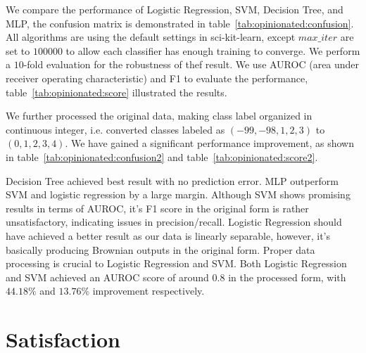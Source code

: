 \documentclass[11pt,twocolumn,letterpaper]{article}
\begin{document}
\begin{table}[htb]
\vspace{-1mm}
    \caption{Performance of different models in classifying $Opinionated$, after data processing. Values are averaged over $10$-fold evaluations.}
\label{tab:opinionated:score2}\vspace{-3mm}
\end{table}

We compare the performance of Logistic Regression, SVM, Decision Tree, and MLP, the confusion matrix is demonstrated in table~\ref{tab:opinionated:confusion}.
All algorithms are using the default settings in sci-kit-learn, except $max\_iter$ are set to $100000$ to allow each classifier has enough training to converge.
We perform a $10$-fold evaluation for the robustness of thef result.
We use AUROC (area under receiver operating characteristic) and F1 to evaluate the performance, table~\ref{tab:opinionated:score} illustrated the results.

We further processed the original data, making class label organized in continuous integer, i.e. converted classes labeled as $(-99, -98, 1, 2, 3)$ to $(0, 1, 2, 3, 4)$.
We have gained a significant performance improvement, as shown in table~\ref{tab:opinionated:confusion2} and table~\ref{tab:opinionated:score2}.

Decision Tree achieved best result with no prediction error.
MLP outperform SVM and logistic regression by a large margin.
Although SVM shows promising results in terms of AUROC, it's F1 score in the original form is rather unsatisfactory, indicating issues in precision/recall.
Logistic Regression should have achieved a better result as our data is linearly separable, however, it's basically producing Brownian outputs in the original form.
Proper data processing is crucial to Logistic Regression and SVM.
Both Logistic Regression and SVM achieved an AUROC score of around $0.8$ in the processed form, with $44.18\%$ and $13.76\%$ improvement respectively.

\section{Satisfaction}\label{satisfaction}
\end{document}
